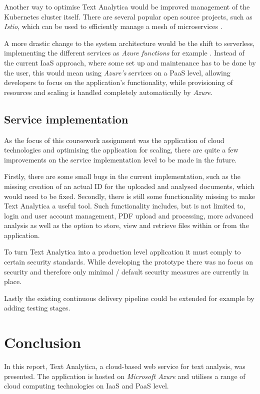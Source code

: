 \documentclass[conference]{IEEEtran}
\begin{document}
Another way to optimise Text Analytica would be improved management of the Kubernetes cluster itself. There are several popular open source projects, such as \textit{Istio}, which can be used to efficiently manage a mesh of microservices \cite{Istio}.

A more drastic change to the system architecture would be the shift to serverless, implementing the different services as \textit{Azure functions} for example \cite{AzureFunctions}. Instead of the current IaaS approach, where some set up and maintenance has to be done by the user, this would mean using \textit{Azure's} services on a PaaS level, allowing developers to focus on the application's functionality, while provisioning of resources and scaling is handled completely automatically by \textit{Azure}.

\subsection{Service implementation}
As the focus of this coursework assignment was the application of cloud technologies and optimising the application for scaling, there are quite a few improvements on the service implementation level to be made in the future.

Firstly, there are some small bugs in the current implementation, such as the missing creation of an actual ID for the uploaded and analysed documents, which would need to be fixed. Secondly, there is still some functionality missing to make Text Analytica a useful tool. Such functionality includes, but is not limited to, login and user account management, PDF upload and processing, more advanced analysis as well as the option to store, view and retrieve files within or from the application.

To turn Text Analytica into a production level application it must comply to certain security standards. While developing the prototype there was no focus on security and therefore only minimal / default security measures are currently in place.

Lastly the existing continuous delivery pipeline could be extended for example by adding testing stages.

\section{Conclusion}
\label{sec:conclusion}
In this report, Text Analytica, a cloud-based web service for text analysis, was presented. The application is hosted on \textit{Microsoft Azure} and utilises a range of cloud computing technologies on IaaS and PaaS level.
\end{document}
